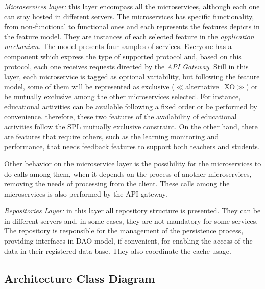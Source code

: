 \textit{Microservices layer:} this layer encompass all the microservices, although each one can stay hosted in different servers. The microservices has specific functionality, from non-functional to functional ones and each represents the features depicts in the feature model. They are instances of each selected feature in the \textit{application mechanism}. The model presents four samples of services. Everyone has a component which express the type of supported protocol and, based on this protocol, each one receives requests directed by the \textit{API Gateway}. Still in this layer, each microservice is tagged as optional variability, but following the feature model, some of them will be represented as exclusive ($\ll$alternative\_XO$\gg$) or be mutually exclusive among the other microservices selected. For instance, educational activities can be available following a fixed order or be performed by convenience, therefore, these two features of the availability of educational activities follow the SPL mutually exclusive constraint. On the other hand, there are features that require others, such as the learning monitoring and performance, that needs feedback features to support both teachers and students.

Other behavior on the microservice layer is the possibility for the microservices to do calls among them, when it depends on the process of another microservices, removing the needs of processing from the client. These calls among the microservices is also performed by the API gateway.




\textit{Repositories Layer:} in this layer all repository structure is presented. They can be in different servers and, in some cases, they are not mandatory for some services. The repository is responsible for the management of the persistence process, providing interfaces in DAO model, if convenient, for enabling the access of the data in their registered data base. They also coordinate the cache usage.




\subsection{Architecture Class Diagram}





